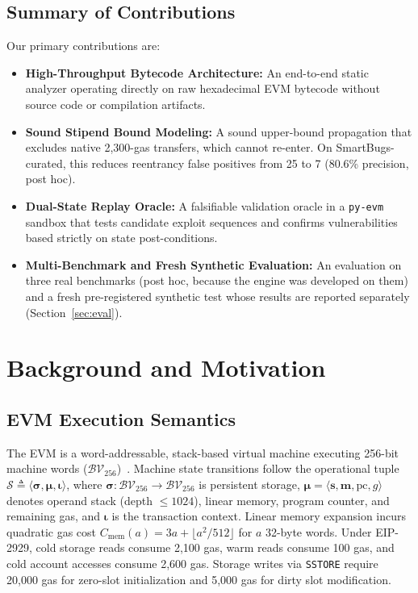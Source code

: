 \documentclass[conference]{IEEEtran}
\begin{document}
\subsection{Summary of Contributions}
Our primary contributions are:
\begin{itemize}
    \item \textbf{High-Throughput Bytecode Architecture:} An end-to-end static analyzer operating directly on raw hexadecimal EVM bytecode without source code or compilation artifacts.
    \item \textbf{Sound Stipend Bound Modeling:} A sound upper-bound propagation that excludes native 2,300-gas transfers, which cannot re-enter. On SmartBugs-curated, this reduces reentrancy false positives from 25 to 7 (80.6\% precision, post hoc).
    \item \textbf{Dual-State Replay Oracle:} A falsifiable validation oracle in a \texttt{py-evm} sandbox that tests candidate exploit sequences and confirms vulnerabilities based strictly on state post-conditions.
    \item \textbf{Multi-Benchmark and Fresh Synthetic Evaluation:} An evaluation on three real benchmarks (post hoc, because the engine was developed on them) and a fresh pre-registered synthetic test whose results are reported separately (Section~\ref{sec:eval}).
\end{itemize}

\section{Background and Motivation}\label{sec:background}

\subsection{EVM Execution Semantics}
The EVM is a word-addressable, stack-based virtual machine executing 256-bit machine words ($\mathcal{BV}_{256}$)~\cite{wood2014ethereum, grishchenko2018semantic}. Machine state transitions follow the operational tuple $\mathcal{S} \triangleq \langle \mathbf{\sigma}, \mathbf{\mu}, \mathbf{\iota} \rangle$, where $\mathbf{\sigma}: \mathcal{BV}_{256} \to \mathcal{BV}_{256}$ is persistent storage, $\mathbf{\mu} = \langle \mathbf{s}, \mathbf{m}, \mathrm{pc}, g \rangle$ denotes operand stack (depth $\le 1024$), linear memory, program counter, and remaining gas, and $\mathbf{\iota}$ is the transaction context. Linear memory expansion incurs quadratic gas cost $C_{\mathrm{mem}}(a) = 3a + \lfloor a^2/512 \rfloor$ for $a$ 32-byte words. Under EIP-2929, cold storage reads consume 2,100 gas, warm reads consume 100 gas, and cold account accesses consume 2,600 gas. Storage writes via \texttt{SSTORE} require 20,000 gas for zero-slot initialization and 5,000 gas for dirty slot modification.
\end{document}
